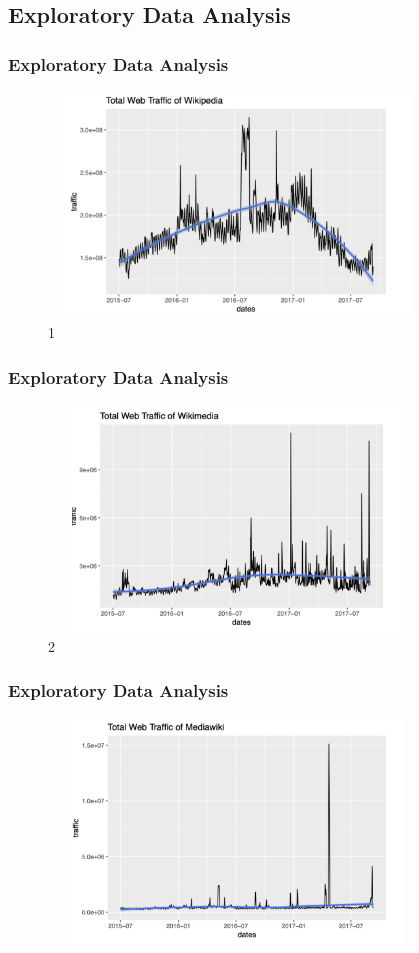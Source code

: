 \documentclass[cjk,10pt]{beamer}
\begin{document}
\begin{CJK*}{GBK}{song}
    \section{Exploratory Data Analysis}
    \begin{frame}
    \frametitle{Exploratory Data Analysis}
    \begin{figure}[htbp]
\centering
\includegraphics[height=6cm, width=10cm]{1}
\caption{1}
\end{figure}
       \end{frame}
    \begin{frame}
        \frametitle{Exploratory Data Analysis}
    \begin{figure}[htbp]
\centering
\includegraphics[height=6cm, width=10cm]{2}
\caption{2}
\end{figure}
       \end{frame}
       \begin{frame}
        \frametitle{Exploratory Data Analysis}
    \begin{figure}[htbp]
\centering
\includegraphics[height=6cm, width=10cm]{3}

\end{figure}
\end{frame}
\end{CJK*}
\end{document}
